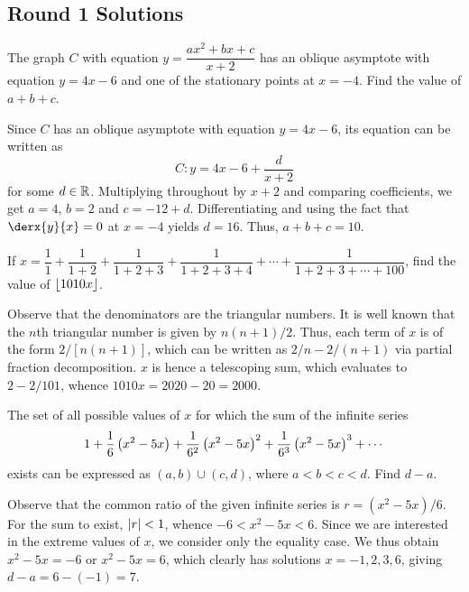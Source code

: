\subsection{Round 1 Solutions}\label{S::2023-O-1}


\begin{question}[10]\label{A::2023-O-1-1}
    The graph $C$ with equation $y = \dfrac{ax^2 + bx + c}{x+2}$ has an oblique asymptote with equation $y = 4x - 6$ and one of the stationary points at $x = -4$. Find the value of $a + b + c$.
\end{question}

Since $C$ has an oblique asymptote with equation $y = 4x - 6$, its equation can be written as \[C: y = 4x - 6 + \frac{d}{x+2}\] for some $d \in \mathbb{R}$. Multiplying throughout by $x+2$ and comparing coefficients, we get $a = 4$, $b = 2$ and $c = -12 + d$. Differentiating and using the fact that $\derx{y}{x} = 0$ at $x = -4$ yields $d = 16$. Thus, $a + b + c = 10$.

\begin{question}[2000]\label{A::2023-O-1-2}
    If $x = \dfrac{1}{1} + \dfrac{1}{1+2} + \dfrac{1}{1+2+3} + \dfrac{1}{1+2+3+4} + \cdots + \dfrac{1}{1 + 2 + 3 + \cdots + 100}$, find the value of $\left\lfloor 1010x \right\rfloor$.
\end{question}

Observe that the denominators are the triangular numbers. It is well known that the $n$th triangular number is given by $n(n+1)/2$. Thus, each term of $x$ is of the form $2/[n(n+1)]$, which can be written as $2/n - 2/(n+1)$ via partial fraction decomposition. $x$ is hence a telescoping sum, which evaluates to $2 - 2/101$, whence $1010x = 2020 - 20 = 2000$.

\begin{question}[7]\label{A::2023-O-1-3}
    The set of all possible values of $x$ for which the sum of the infinite series \[1 + \dfrac16 \left( x^2 - 5x \right) + \dfrac1{6^2} \left( x^2 - 5x \right)^2 + \dfrac1{6^3} \left( x^2 - 5x \right)^3 + \cdots\] exists can be expressed as $(a, b) \cup (c, d)$, where $a < b < c < d$. Find $d - a$.
\end{question}

Observe that the common ratio of the given infinite series is $r = (x^2 - 5x)/6$. For the sum to exist, $\left\lvert r \right\rvert < 1$, whence $-6 < x^2 - 5x < 6$. Since we are interested in the extreme values of $x$, we consider only the equality case. We thus obtain $x^2 - 5x = -6$ or $x^2 - 5x = 6$, which clearly has solutions $x = -1, 2, 3, 6$, giving $d - a = 6 - (-1) = 7$.

